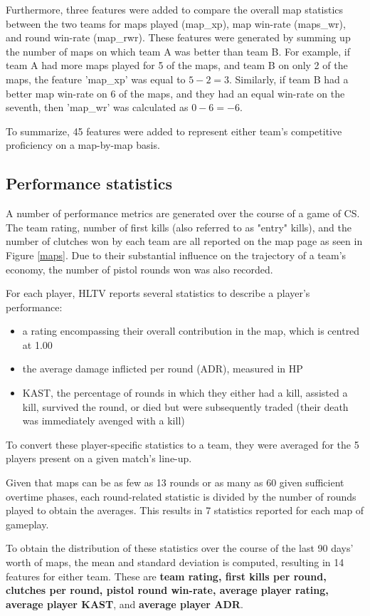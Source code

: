 Furthermore, three features were added to compare the overall map statistics between the two teams for maps played (map\_xp), map win-rate (maps\_wr), and round win-rate (map\_rwr). These features were generated by summing up the number of maps on which team A was better than team B. For example, if team A had more maps played for 5 of the maps, and team B on only 2 of the maps, the feature 'map\_xp' was equal to $5 - 2 = 3$. Similarly, if team B had a better map win-rate on 6 of the maps, and they had an equal win-rate on the seventh, then 'map\_wr' was calculated as $0 - 6 = -6$. 

To summarize, 45 features were added to represent either team's competitive proficiency on a map-by-map basis.

\subsection{Performance statistics}

A number of performance metrics are generated over the course of a game of CS. The team rating, number of first kills (also referred to as "entry" kills), and the number of clutches won by each team are all reported on the map page as seen in Figure \ref{maps}. Due to their substantial influence on the trajectory of a team's economy, the number of pistol rounds won was also recorded. 

For each player, HLTV reports several statistics to describe a player's performance:
\begin{itemize}
	\item a rating encompassing their overall contribution in the map, which is centred at 1.00
	\item the average damage inflicted per round (ADR), measured in HP
	\item KAST, the percentage of rounds in which they either had a kill, assisted a kill, survived the round, or died but were subsequently traded (their death was immediately avenged with a kill)
\end{itemize}
To convert these player-specific statistics to a team, they were averaged for the 5 players present on a given match's line-up.

Given that maps can be as few as 13 rounds or as many as 60 given sufficient overtime phases, each round-related statistic is divided by the number of rounds played to obtain the averages. This results in 7 statistics reported for each map of gameplay.

To obtain the distribution of these statistics over the course of the last 90 days' worth of maps, the mean and standard deviation is computed, resulting in 14 features for either team. These are \textbf{team rating, first kills per round, clutches per round, pistol round win-rate, average player rating, average player KAST}, and \textbf{average player ADR}.

